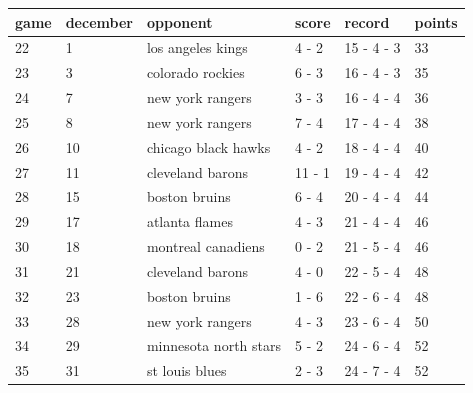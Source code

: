 \documentclass{article}
\begin{document}
\begin{tabular}{llllll}
\toprule
game & december & opponent & score & record & points \\
\midrule
22 & 1 & los angeles kings & 4 - 2 & 15 - 4 - 3 & 33 \\
23 & 3 & colorado rockies & 6 - 3 & 16 - 4 - 3 & 35 \\
24 & 7 & new york rangers & 3 - 3 & 16 - 4 - 4 & 36 \\
25 & 8 & new york rangers & 7 - 4 & 17 - 4 - 4 & 38 \\
26 & 10 & chicago black hawks & 4 - 2 & 18 - 4 - 4 & 40 \\
27 & 11 & cleveland barons & 11 - 1 & 19 - 4 - 4 & 42 \\
28 & 15 & boston bruins & 6 - 4 & 20 - 4 - 4 & 44 \\
29 & 17 & atlanta flames & 4 - 3 & 21 - 4 - 4 & 46 \\
30 & 18 & montreal canadiens & 0 - 2 & 21 - 5 - 4 & 46 \\
31 & 21 & cleveland barons & 4 - 0 & 22 - 5 - 4 & 48 \\
32 & 23 & boston bruins & 1 - 6 & 22 - 6 - 4 & 48 \\
33 & 28 & new york rangers & 4 - 3 & 23 - 6 - 4 & 50 \\
34 & 29 & minnesota north stars & 5 - 2 & 24 - 6 - 4 & 52 \\
35 & 31 & st louis blues & 2 - 3 & 24 - 7 - 4 & 52 \\
\bottomrule
\end{tabular}
\end{document}
